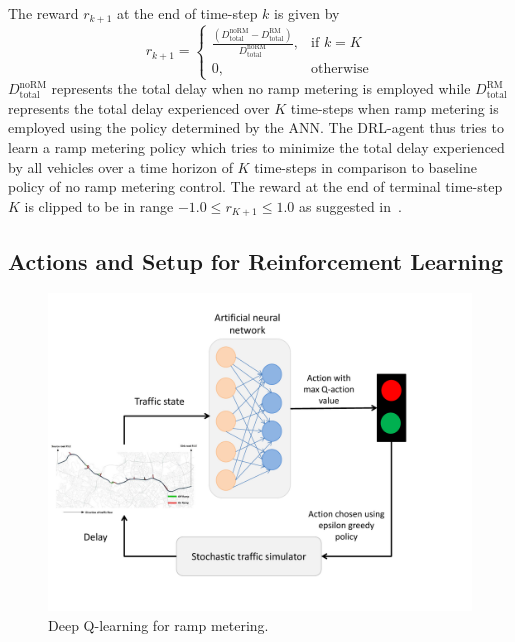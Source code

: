 \documentclass[conference]{IEEEtran}
\begin{document}
The reward $r_{k+1}$ at the end of time-step $k$ is given by
\begin{equation}
r_{k+1}=\begin{cases}
\frac{(D^{\text{noRM}}_{\text{total}}-D^{\text{RM}}_{\text{total}})}{D^{\text{noRM}}_{\text{total}}}, & \text{if } k=K \\
0, & \text{otherwise}
\end{cases}
\end{equation}
$D_{\text{total}}^{\text{noRM}}$ represents the total delay when no ramp metering is employed while $D_{\text{total}}^{\text{RM}}$ represents the total delay experienced over $K$ time-steps when ramp metering is employed using the policy determined by the \ac{ANN}. The DRL-agent thus tries to learn a ramp metering policy which tries to minimize the total delay experienced by all vehicles over a time horizon of $K$ time-steps in comparison to baseline policy of no ramp metering control. The reward at the end of terminal time-step $K$  is clipped to be in range $-1.0\le r_{K+1}\le 1.0$ as suggested in~\cite{mnih2015human}.



\subsection{Actions and Setup for Reinforcement Learning}

\begin{figure}[!htbp]
	\centering
	\includegraphics[scale=0.385]{images/DQN-RM.pdf}
	
	\caption{Deep Q-learning for ramp metering.}
	\label{fig:dqn-rm}
\end{figure}
\end{document}
